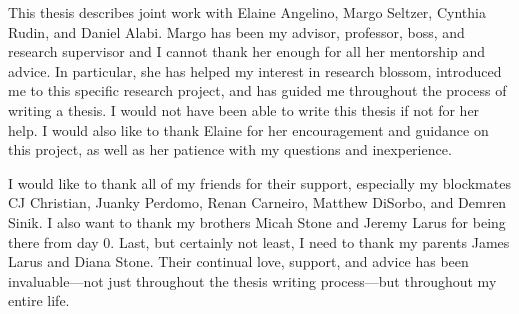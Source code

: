 
This thesis describes joint work with Elaine Angelino, Margo Seltzer, Cynthia Rudin, and Daniel Alabi.
Margo has been my advisor, professor, boss, and research supervisor and I cannot thank her enough for all her mentorship and advice.
In particular, she has helped my interest in research blossom, introduced me to this specific research project, and has guided me throughout the process of writing a thesis.
I would not have been able to write this thesis if not for her help.
I would also like to thank Elaine for her encouragement and guidance on this project, as well as her patience with my questions and inexperience.

I would like to thank all of my friends for their support, especially my blockmates CJ Christian, Juanky Perdomo, Renan Carneiro, Matthew DiSorbo, and Demren Sinik.
I also want to thank my brothers Micah Stone and Jeremy Larus for being there from day 0.
Last, but certainly not least, I need to thank my parents James Larus and Diana Stone.
Their continual love, support, and advice has been invaluable---not just throughout the thesis writing process---but throughout my entire life. 
